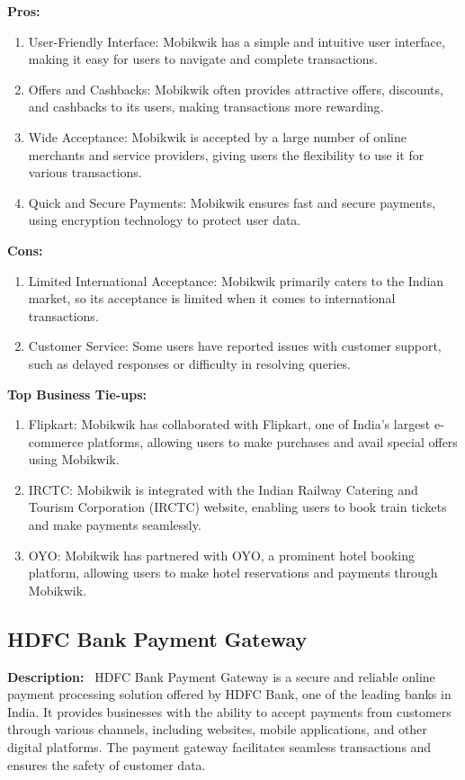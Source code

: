 \textbf{Pros:}

\begin{enumerate}
  \item User-Friendly Interface: Mobikwik has a simple and intuitive user interface, making it easy for users to navigate and complete transactions.
  \item Offers and Cashbacks: Mobikwik often provides attractive offers, discounts, and cashbacks to its users, making transactions more rewarding.
  \item Wide Acceptance: Mobikwik is accepted by a large number of online merchants and service providers, giving users the flexibility to use it for various transactions.
  \item Quick and Secure Payments: Mobikwik ensures fast and secure payments, using encryption technology to protect user data.
\end{enumerate}

\textbf{Cons:}

\begin{enumerate}
  \item Limited International Acceptance: Mobikwik primarily caters to the Indian market, so its acceptance is limited when it comes to international transactions.
  \item Customer Service: Some users have reported issues with customer support, such as delayed responses or difficulty in resolving queries.
\end{enumerate}

\textbf{Top Business Tie-ups:}

\begin{enumerate}
  \item Flipkart: Mobikwik has collaborated with Flipkart, one of India's largest e-commerce platforms, allowing users to make purchases and avail special offers using Mobikwik.
  \item IRCTC: Mobikwik is integrated with the Indian Railway Catering and Tourism Corporation (IRCTC) website, enabling users to book train tickets and make payments seamlessly.
  \item OYO: Mobikwik has partnered with OYO, a prominent hotel booking platform, allowing users to make hotel reservations and payments through Mobikwik.
\end{enumerate}

\subsection{HDFC Bank Payment Gateway}
\textbf{Description:} \
HDFC Bank Payment Gateway is a secure and reliable online payment processing solution offered by HDFC Bank, one of the leading banks in India. It provides businesses with the ability to accept payments from customers through various channels, including websites, mobile applications, and other digital platforms. The payment gateway facilitates seamless transactions and ensures the safety of customer data.

